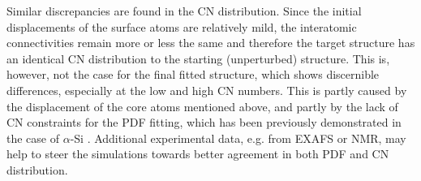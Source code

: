 Similar discrepancies are found in the CN distribution. Since the initial displacements of the surface atoms are relatively mild, the interatomic connectivities remain more or less the same and therefore the target structure has an identical CN distribution to the starting (unperturbed) structure. This is, however, not the case for the final fitted structure, which shows discernible differences, especially at the low and high CN numbers. This is partly caused by the  displacement of the core atoms mentioned above, and partly by the lack of CN constraints  for the PDF fitting, which has been previously demonstrated in the case of  $\alpha$-Si \cite{Cliffe2010}. Additional experimental data, e.g. from EXAFS or NMR, may help to steer the simulations towards better agreement in both PDF and CN distribution.
